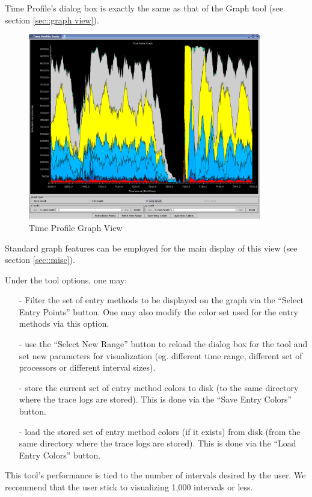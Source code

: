 \documentclass[10pt]{article}
\begin{document}
Time Profile's dialog box is exactly the same as that of the Graph
tool (see section \ref{sec::graph view}).

\begin{figure}[htb]
\center
\includegraphics[width=4.0in]{fig/timeprofile}
\caption{Time Profile Graph View}
\label{time profile}
\end{figure}

Standard graph features can be employed for the main display of this
view (see section \ref{sec::misc}).

Under the tool options, one may:

\begin{itemize}
\item[-] Filter the set of entry methods to be displayed on the graph via
the ``Select Entry Points'' button. One may also modify the color set used
for the entry methods via this option.
\item[-] use the ``Select New Range'' button to reload the dialog box
for the tool and set new parameters for visualization (eg. different
time range, different set of processors or different interval sizes).
\item[-] store the current set of entry method colors to disk (to the
same directory where the trace logs are stored). This is done via the
``Save Entry Colors'' button.
\item[-] load the stored set of entry method colors (if it exists)
from disk (from the same directory where the trace logs are
stored). This is done via the ``Load Entry Colors'' button.
\end{itemize}

This tool's performance is tied to the number of intervals desired by
the user. We recommend that the user stick to visualizing 1,000
intervals or less.
\end{document}
